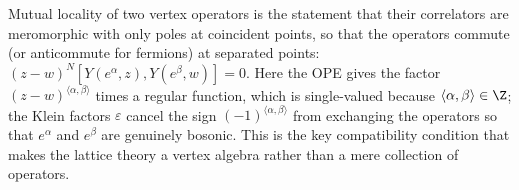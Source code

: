 \begin{physics}
Mutual locality of two vertex operators is the statement that their correlators are meromorphic with only poles at coincident points, so that the operators commute (or anticommute for fermions) at separated points: $(z-w)^N[Y(e^\alpha,z),Y(e^\beta,w)]=0$. Here the OPE gives the factor $(z-w)^{\langle\alpha,\beta\rangle}$ times a regular function, which is single-valued because $\langle\alpha,\beta\rangle\in\Z$; the Klein factors $\varepsilon$ cancel the sign $(-1)^{\langle\alpha,\beta\rangle}$ from exchanging the operators so that $e^\alpha$ and $e^\beta$ are genuinely bosonic. This is the key compatibility condition that makes the lattice theory a vertex algebra rather than a mere collection of operators.
\end{physics}

